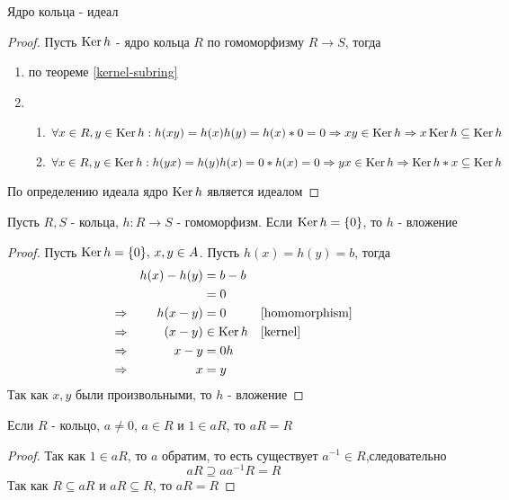 \documentclass[../main/document.tex]{subfiles}
\begin{document}
\begin{thm}\label{kernel-is-ideal}
Ядро кольца - идеал
\begin{proof}
Пусть $\operatorname{Ker} h$ - ядро кольца $R$ по гомоморфизму $R\to S$, тогда
\begin{enumerate}
\item по теореме \ref{kernel-subring}
\item
\begin{enumerate}
\item $\forall x\in R, y\in \operatorname{Ker} h: h(xy)=h(x)h(y)=h(x)*0=0\Rightarrow xy\in \operatorname{Ker} h\Rightarrow x\operatorname{Ker} h\subseteq \operatorname{Ker} h$
\item $\forall x\in R, y\in \operatorname{Ker} h: h(yx)=h(y)h(x)=0*h(x)=0\Rightarrow yx\in \operatorname{Ker} h\Rightarrow \operatorname{Ker} h*x\subseteq \operatorname{Ker} h$
\end{enumerate}

\end{enumerate}
По определению идеала ядро $\operatorname{Ker} h$ является идеалом
\end{proof}
\end{thm}
\begin{exm}

\begin{thm}\label{zero-kernel-injection}
Пусть $R,S$ - кольца, $h:R\to S$ - гомоморфизм. Если $\operatorname{Ker} h=\{0\}$, то $h$ - вложение
\begin{proof}
Пусть $\operatorname{Ker} h=\{0\},\,x,y\in A$. Пусть $h(x)=h(y)=b$, тогда
\begin{align*}
 &          & h(x)-h(y)&=b-b & &\\
 &          & &=0         &    &\\
\Rightarrow & & h(x-y)&=0 & & \ref{homomorphism}\\
\Rightarrow & & (x-y)&\in\operatorname{Ker} h & & \ref{kernel}\\
\Rightarrow & & x-y&=0 h & & \\
\Rightarrow & & x&=y & & 
\end{align*}
Так как $x,y$ были произвольными, то $h$ - вложение
\end{proof}
\end{thm}

\end{exm}
\begin{lemma}\label{unit-trivial}
Если $R$ - кольцо, $a\neq 0$, $a\in R$ и $1\in aR$, то $aR=R$
\begin{proof}
Так как $1\in aR$, то $a$ обратим, то есть существует $a^{-1}\in R$,следовательно
$$aR\supseteq aa^{-1}R= R$$
Так как $R\subseteq aR$ и $aR\subseteq R$, то $aR=R$
\end{proof}
\end{lemma}
\end{document}
